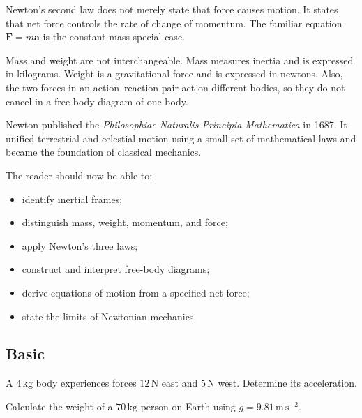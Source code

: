 \begin{physical}
Newton's second law does not merely state that force causes motion. It states
that net force controls the rate of change of momentum. The familiar equation
$\mathbf F=m\mathbf a$ is the constant-mass special case.
\end{physical}

\begin{warningbox}
Mass and weight are not interchangeable. Mass measures inertia and is expressed
in kilograms. Weight is a gravitational force and is expressed in newtons.
Also, the two forces in an action--reaction pair act on different bodies, so
they do not cancel in a free-body diagram of one body.
\end{warningbox}

\begin{chapterhistorical}
Newton published the \emph{Philosophiae Naturalis Principia Mathematica} in
1687. It unified terrestrial and celestial motion using a small set of
mathematical laws and became the foundation of classical mechanics.
\end{chapterhistorical}

\chapteroutcomesheading
\begin{outcomesbox}
The reader should now be able to:
\begin{itemize}
\item identify inertial frames;
\item distinguish mass, weight, momentum, and force;
\item apply Newton's three laws;
\item construct and interpret free-body diagrams;
\item derive equations of motion from a specified net force;
\item state the limits of Newtonian mechanics.
\end{itemize}
\end{outcomesbox}

\chapterexercisesheading
\subsection*{Basic}
\begin{chapterexercise}
A $4\,\mathrm{kg}$ body experiences forces
$12\,\mathrm N$ east and $5\,\mathrm N$ west. Determine its acceleration.
\end{chapterexercise}

\begin{chapterexercise}
Calculate the weight of a $70\,\mathrm{kg}$ person on Earth using
$g=9.81\,\mathrm{m\,s^{-2}}$.
\end{chapterexercise}

